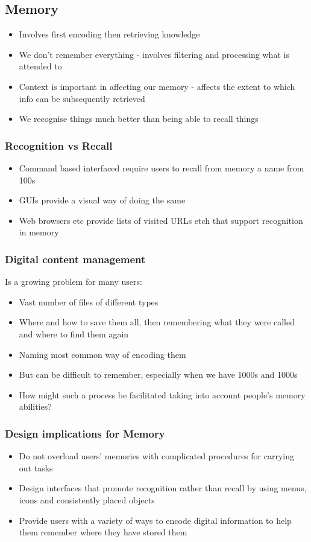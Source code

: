 \documentclass{article}[18pt]
\begin{document}
\subsection{Memory}
\begin{itemize}
	\item Involves first encoding then retrieving knowledge
	\item We don't remember everything - involves filtering and processing what is attended to
	\item Context is important in affecting our memory - affects the extent to which info can be subsequently retrieved
	\item We recognise things much better than being able to recall things
\end{itemize}
\subsubsection{Recognition vs Recall}
\begin{itemize}
	\item Command based interfaced require users to recall from memory a name from 100s
	\item GUIs provide a visual way of doing the same
	\item Web browsers etc provide lists of visited URLs etch that support recognition in memory
\end{itemize}
\subsubsection{Digital content management}
Is a growing problem for many users:
\begin{itemize}
	\item Vast number of files of different types
	\item Where and how to save them all, then remembering what they were called and where to find them again
	\item Naming most common way of encoding them
	\item But can be difficult to remember, especially when we have 1000s and 1000s
	\item How might such a process be facilitated taking into account people's memory abilities?
\end{itemize}
\subsubsection{Design implications for Memory}
\begin{itemize}
	\item Do not overload users' memories with complicated procedures for carrying out tasks
	\item Design interfaces that promote recognition rather than recall by using menus, icons and consistently placed objects
	\item Provide users with a variety of ways to encode digital information to help them remember where they have stored them
\end{itemize}
\end{document}
